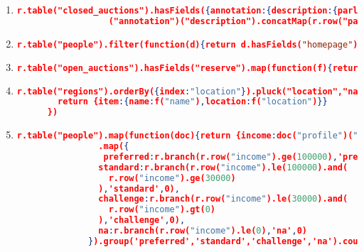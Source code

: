 \begin{enumerate}[label=Q\arabic*]
    \item \label{rethink-q-16}%
	\begin{lstlisting}[language=JSON, basicstyle=\scriptsize]
	  r.table("closed_auctions").hasFields({annotation:{description:{parlist:true}}})
	              ("annotation")("description").concatMap(r.row("parlist")).hasFields({listitem:{parlist:true}})("listitem").concatMap(r.row("parlist")).hasFields({listitem:{text:{emph:{keyword:true}}}})
	\end{lstlisting}	

    
    \item \label{rethink-q-17}%
	\begin{lstlisting}[language=JSON, basicstyle=\scriptsize]
	  r.table("people").filter(function(d){return d.hasFields("homepage").not()}).map({person:{name:r.row("name")}})
	\end{lstlisting}	

    \item \label{rethink-q-18}%
	\begin{lstlisting}[language=JSON, basicstyle=\scriptsize]
	  r.table("open_auctions").hasFields("reserve").map(function(f){return f("reserve").mul(2.20371)})
	\end{lstlisting}	

    \item \label{rethink-q-19}%
	\begin{lstlisting}[language=JSON, basicstyle=\scriptsize]
	  r.table("regions").orderBy({index:"location"}).pluck("location","name").map(function(f){
	    return {item:{name:f("name"),location:f("location")}}
	  })
	\end{lstlisting}
	
    \item \label{rethink-q-20}%
	\begin{lstlisting}[language=JSON, basicstyle=\scriptsize]
	  r.table("people").map(function(doc){return {income:doc("profile")("income").default(0)}})
	            .map({
	             preferred:r.branch(r.row("income").ge(100000),'preferred',0),
	            standard:r.branch(r.row("income").le(100000).and(
	              r.row("income").ge(30000)
	            ),'standard',0),
	            challenge:r.branch(r.row("income").le(30000).and(
	              r.row("income").gt(0)
	            ),'challenge',0),
	            na:r.branch(r.row("income").le(0),'na',0)
	          }).group('preferred','standard','challenge','na').count()
	\end{lstlisting}

\end{enumerate}


